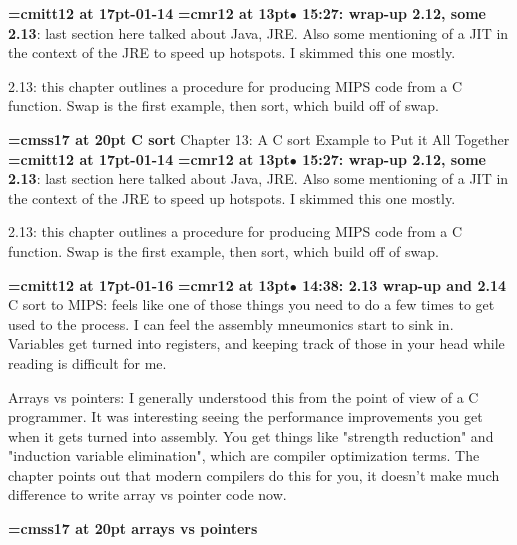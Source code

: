 {\medskip\noindent\bf\font\titlefont=cmitt12 at 17pt-01-14}\medskip
{\smallskip\noindent\bf\font\titlefont=cmr12 at 13pt\titlefont $\bullet$ 15:27: wrap-up 2.12, some 2.13}: last section here talked about Java, JRE. Also some mentioning of a JIT in the context of the JRE to speed up hotspots. I skimmed this one mostly.
\par

2.13: this chapter outlines a procedure for producing MIPS code from a C function. Swap is the first example, then sort, which build off of swap.
\par

{\medskip\noindent\bf\font\titlefont=cmss17 at 20pt C sort}\medskip
Chapter 13: A C sort Example to Put it All Together
{\medskip\noindent\bf\font\titlefont=cmitt12 at 17pt-01-14}\medskip
{\smallskip\noindent\bf\font\titlefont=cmr12 at 13pt\titlefont $\bullet$ 15:27: wrap-up 2.12, some 2.13}: last section here talked about Java, JRE. Also some mentioning of a JIT in the context of the JRE to speed up hotspots. I skimmed this one mostly.
\par

2.13: this chapter outlines a procedure for producing MIPS code from a C function. Swap is the first example, then sort, which build off of swap.
\par

{\medskip\noindent\bf\font\titlefont=cmitt12 at 17pt-01-16}\medskip
{\smallskip\noindent\bf\font\titlefont=cmr12 at 13pt\titlefont $\bullet$ 14:38: 2.13 wrap-up and 2.14}\smallskip
C sort to MIPS: feels like one of those things you need to do a few times to get used to the process. I can feel the assembly mneumonics start to sink in. Variables get turned into registers, and keeping track of those in your head while reading is difficult for me.
\par

Arrays vs pointers: I generally understood this from the point of view of a C programmer. It was interesting seeing the performance improvements you get when it gets turned into assembly. You get things like "strength reduction" and "induction variable elimination", which are compiler optimization terms. The chapter points out that modern compilers do this for you, it doesn't make much difference to write array vs pointer code now.
\par

{\medskip\noindent\bf\font\titlefont=cmss17 at 20pt arrays vs pointers}\medskip

